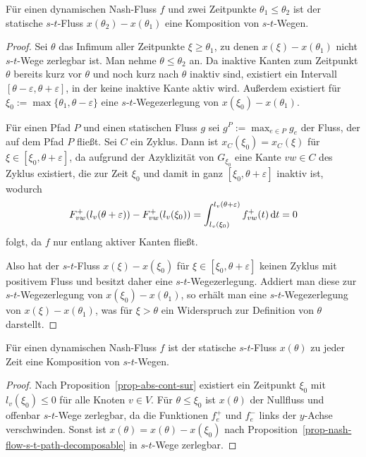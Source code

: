 \begin{proposition}\label{prop-nash-flow-s-t-path-decomposable}
	Für einen dynamischen Nash-Fluss $f$ und zwei Zeitpunkte $\theta_1 \leq \theta_2$ ist der statische $s$-$t$-Fluss $x(\theta_2) - x(\theta_1)$ eine Komposition von $s$-$t$-Wegen.
\end{proposition}
\begin{proof}
	Sei $\theta$ das Infimum aller Zeitpunkte $\xi\geq\theta_1$, zu denen $x(\xi) - x(\theta_1)$ nicht $s$-$t$-Wege zerlegbar ist.
	Man nehme $\theta \leq \theta_2$ an.
	Da inaktive Kanten zum Zeitpunkt $\theta$ bereits kurz vor $\theta$ und noch kurz nach $\theta$ inaktiv sind, existiert ein Intervall $[\theta - \varepsilon, \theta + \varepsilon]$, in der keine inaktive Kante aktiv wird.
	Außerdem existiert für $\xi_0 := \max \{ \theta_1, \theta - \varepsilon \}$ eine $s$-$t$-Wegezerlegung von $x(\xi_0) - x(\theta_1)$.
	
	Für einen Pfad $P$ und einen statischen Fluss $g$ sei $g^P := \max_{e\in P} g_e$ der Fluss, der auf dem Pfad $P$ fließt.
	Sei $C$ ein Zyklus.
	Dann ist $x_C(\xi_0) = x_C(\xi)$ für $\xi\in [\xi_0, \theta+\varepsilon]$, da aufgrund der Azyklizität von $G_{\xi_0}$ eine Kante $vw\in C$ des Zyklus existiert, die zur Zeit $\xi_0$ und damit in ganz $[\xi_0, \theta+\varepsilon]$ inaktiv ist, wodurch
	$$F_{vw}^+(l_v(\theta + \varepsilon)) - F_{vw}^+(l_v(\xi_0)) = \int_{l_v(\xi_0)}^{l_v(\theta + \varepsilon)} f_{vw}^+(t) \mathop{}\!\mathrm{d} t = 0$$
	folgt, da $f$ nur entlang aktiver Kanten fließt.
	
	Also hat der $s$-$t$-Fluss $x(\xi) - x(\xi_0)$ für $\xi\in [\xi_0, \theta + \varepsilon]$ keinen Zyklus mit positivem Fluss und besitzt daher eine $s$-$t$-Wegezerlegung.
	Addiert man diese zur $s$-$t$-Wegezerlegung von $x(\xi_0) - x(\theta_1)$, so erhält man eine $s$-$t$-Wegezerlegung von $x(\xi) - x(\theta_1)$, was für $\xi > \theta$ ein Widerspruch zur Definition von $\theta$ darstellt.
\end{proof}
\begin{corollary}
	Für einen dynamischen Nash-Fluss $f$ ist der statische $s$-$t$-Fluss $x(\theta)$ zu jeder Zeit eine Komposition von $s$-$t$-Wegen.
\end{corollary}
\begin{proof}
	Nach Proposition~\ref{prop-abs-cont-sur} existiert ein Zeitpunkt $\xi_0$ mit $l_v(\xi_0) \leq 0$ für alle Knoten $v\in V$.
	Für $\theta \leq \xi_0$ ist $x(\theta)$ der Nullfluss und offenbar $s$-$t$-Wege zerlegbar, da die Funktionen $f_e^+$ und $f_e^-$ links der $y$-Achse verschwinden.
	Sonst ist $x(\theta)=  x(\theta) - x(\xi_0)$ nach Proposition~\ref{prop-nash-flow-s-t-path-decomposable} in $s$-$t$-Wege zerlegbar.
\end{proof}